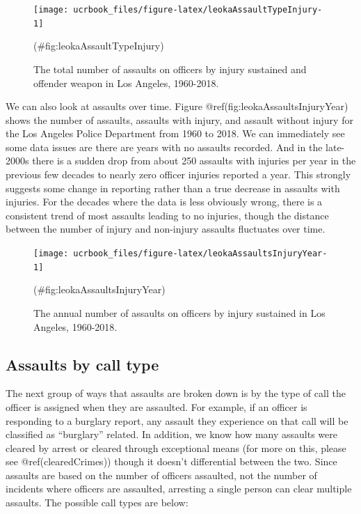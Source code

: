 \documentclass[
  12pt,
  openany]{book}
\begin{document}
\begin{figure}

{\centering \texttt{[image: ucrbook\_files/figure-latex/leokaAssaultTypeInjury-1]} 

}

\caption{The total number of assaults on officers by injury sustained and offender weapon in Los Angeles, 1960-2018.}(\#fig:leokaAssaultTypeInjury)
\end{figure}

We can also look at assaults over time. Figure @ref(fig:leokaAssaultsInjuryYear) shows the number of assaults, assaults with injury, and assault without injury for the Los Angeles Police Department from 1960 to 2018. We can immediately see some data issues are there are years with no assaults recorded. And in the late-2000s there is a sudden drop from about 250 assaults with injuries per year in the previous few decades to nearly zero officer injuries reported a year. This strongly suggests some change in reporting rather than a true decrease in assaults with injuries. For the decades where the data is less obviously wrong, there is a consistent trend of most assaults leading to no injuries, though the distance between the number of injury and non-injury assaults fluctuates over time.

\begin{figure}

{\centering \texttt{[image: ucrbook\_files/figure-latex/leokaAssaultsInjuryYear-1]} 

}

\caption{The annual number of assaults on officers by injury sustained in Los Angeles, 1960-2018.}(\#fig:leokaAssaultsInjuryYear)
\end{figure}

\hypertarget{assaults-by-call-type}{%
\subsection{Assaults by call type}\label{assaults-by-call-type}}

The next group of ways that assaults are broken down is by the type of call the officer is assigned when they are assaulted. For example, if an officer is responding to a burglary report, any assault they experience on that call will be classified as ``burglary'' related. In addition, we know how many assaults were cleared by arrest or cleared through exceptional means (for more on this, please see @ref(clearedCrimes)) though it doesn't differential between the two. Since assaults are based on the number of officers assaulted, not the number of incidents where officers are assaulted, arresting a single person can clear multiple assaults. The possible call types are below:
\end{document}
